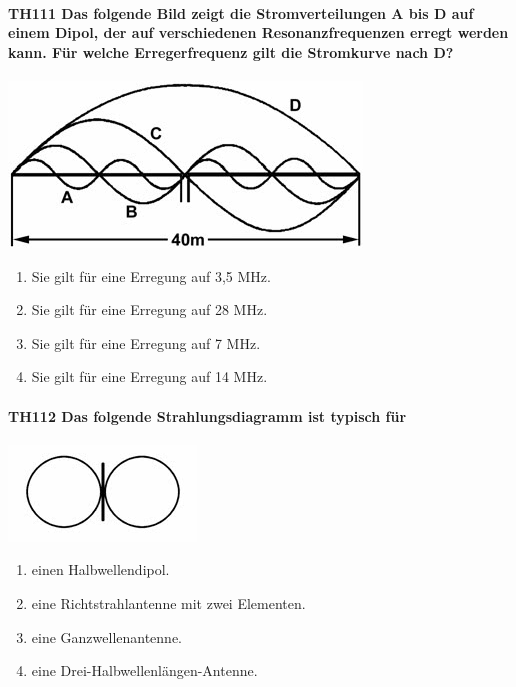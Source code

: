\documentclass[8pt]{article}
\begin{document}
\paragraph*{TH111 Das folgende Bild zeigt die Stromverteilungen A bis D auf einem Dipol, der auf verschiedenen Resonanzfrequenzen erregt werden kann. Für welche Erregerfrequenz gilt die Stromkurve nach D?}
\begin{center}
	\begin{minipage}{\linewidth}
		\centering
		\includegraphics[scale=1.0]{pics/th111_a.jpg}
	\end{minipage}
\end{center}
\begin{enumerate}[nolistsep,label=\Alph*]
\item Sie gilt für eine Erregung auf 3,5 MHz.
\item Sie gilt für eine Erregung auf 28 MHz.
\item Sie gilt für eine Erregung auf 7 MHz.
\item Sie gilt für eine Erregung auf 14 MHz.
\end{enumerate}

\paragraph*{TH112 Das folgende Strahlungsdiagramm ist typisch für} 
\begin{center}
	\begin{minipage}{\linewidth}
		\centering
		\includegraphics[scale=1.0]{pics/th112_a.jpg}
	\end{minipage}
\end{center}
\begin{enumerate}[nolistsep,label=\Alph*]
\item einen Halbwellendipol.
\item eine Richtstrahlantenne mit zwei Elementen.
\item eine Ganzwellenantenne.
\item eine Drei-Halbwellenlängen-Antenne.
\end{enumerate}
\end{document}
